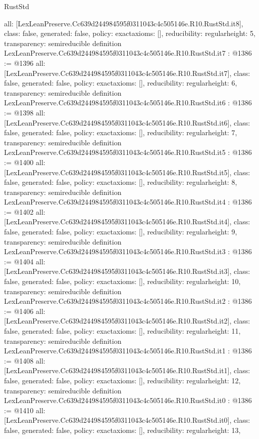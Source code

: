 \begin{lexlean}{RustStd}
\begin{coremodule}
{  all: [LexLeanPreserve.Cc639d244984595f0311043c4c505146e.R10.RustStd.it8],
  class: false,
  generated: false,
  policy: exact{axioms: []},
  reducibility: regular{height: 5},
  transparency: semireducible
}
definition LexLeanPreserve.Cc639d244984595f0311043c4c505146e.R10.RustStd.it7 : @1386 := @1396 {
  all: [LexLeanPreserve.Cc639d244984595f0311043c4c505146e.R10.RustStd.it7],
  class: false,
  generated: false,
  policy: exact{axioms: []},
  reducibility: regular{height: 6},
  transparency: semireducible
}
definition LexLeanPreserve.Cc639d244984595f0311043c4c505146e.R10.RustStd.it6 : @1386 := @1398 {
  all: [LexLeanPreserve.Cc639d244984595f0311043c4c505146e.R10.RustStd.it6],
  class: false,
  generated: false,
  policy: exact{axioms: []},
  reducibility: regular{height: 7},
  transparency: semireducible
}
definition LexLeanPreserve.Cc639d244984595f0311043c4c505146e.R10.RustStd.it5 : @1386 := @1400 {
  all: [LexLeanPreserve.Cc639d244984595f0311043c4c505146e.R10.RustStd.it5],
  class: false,
  generated: false,
  policy: exact{axioms: []},
  reducibility: regular{height: 8},
  transparency: semireducible
}
definition LexLeanPreserve.Cc639d244984595f0311043c4c505146e.R10.RustStd.it4 : @1386 := @1402 {
  all: [LexLeanPreserve.Cc639d244984595f0311043c4c505146e.R10.RustStd.it4],
  class: false,
  generated: false,
  policy: exact{axioms: []},
  reducibility: regular{height: 9},
  transparency: semireducible
}
definition LexLeanPreserve.Cc639d244984595f0311043c4c505146e.R10.RustStd.it3 : @1386 := @1404 {
  all: [LexLeanPreserve.Cc639d244984595f0311043c4c505146e.R10.RustStd.it3],
  class: false,
  generated: false,
  policy: exact{axioms: []},
  reducibility: regular{height: 10},
  transparency: semireducible
}
definition LexLeanPreserve.Cc639d244984595f0311043c4c505146e.R10.RustStd.it2 : @1386 := @1406 {
  all: [LexLeanPreserve.Cc639d244984595f0311043c4c505146e.R10.RustStd.it2],
  class: false,
  generated: false,
  policy: exact{axioms: []},
  reducibility: regular{height: 11},
  transparency: semireducible
}
definition LexLeanPreserve.Cc639d244984595f0311043c4c505146e.R10.RustStd.it1 : @1386 := @1408 {
  all: [LexLeanPreserve.Cc639d244984595f0311043c4c505146e.R10.RustStd.it1],
  class: false,
  generated: false,
  policy: exact{axioms: []},
  reducibility: regular{height: 12},
  transparency: semireducible
}
definition LexLeanPreserve.Cc639d244984595f0311043c4c505146e.R10.RustStd.it0 : @1386 := @1410 {
  all: [LexLeanPreserve.Cc639d244984595f0311043c4c505146e.R10.RustStd.it0],
  class: false,
  generated: false,
  policy: exact{axioms: []},
  reducibility: regular{height: 13},
}
\end{coremodule}
\end{lexlean}
